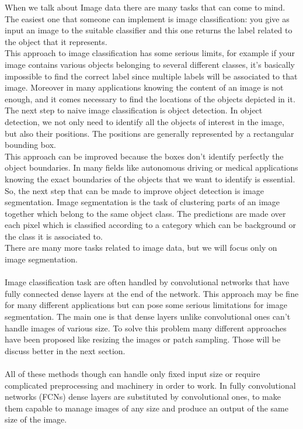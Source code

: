 \documentclass[10pt,twocolumn,letterpaper]{article}
\begin{document}
When we talk about Image data there are many tasks that can come to mind. The easiest one that someone can implement is image classification: you give as input an image to the suitable classifier and this one returns the label related to the object that it represents. \\
This approach to image classification has some serious limits, for example if your image contains various objects belonging to several different classes, it's basically impossible to find the correct label since multiple labels will be associated to that image. Moreover in many applications knowing the content of an image is not enough, and it comes necessary to find the locations of the objects depicted in it. \\
The next step to naive image classification is object detection. In object detection, we not only need to identify all the objects of interest in the image, but also their positions. The positions are generally represented by a rectangular bounding box. \\
This approach can be improved because the boxes don't identify perfectly the object boundaries. In many fields like autonomous driving or medical applications knowing the exact boundaries of the objects that we want to identify is essential.
So, the next step that can be made to improve object detection is image segmentation.
Image segmentation is the task of clustering parts of an image together which belong to the same object class. The predictions are made over each pixel which is classified according to a category which can be background or the class it is associated to. \\
There are many more tasks related to image data, but we will focus only on image segmentation. \\ \\
Image classification task are often handled by convolutional networks that have fully connected dense layers at the end of the network. This approach may be fine for many different applications but can pose some serious limitations for image segmentation. The main one is that dense layers unlike convolutional ones can't handle images of various size. To solve this problem many different approaches have been proposed like resizing the images or patch sampling. Those will be discuss better in the next section. \\ \\
All of these methods though can handle only fixed input size or require complicated preprocessing and machinery in order to work. In fully convolutional networks (FCNs) dense layers are substituted by convolutional ones, to make them capable to manage images of any size and produce an output of the same size of the image.
\end{document}
